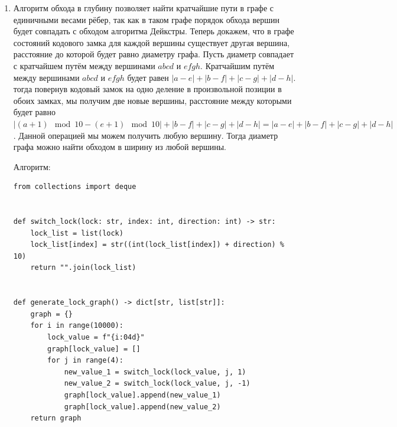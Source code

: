 \documentclass{article}
\begin{document}
\begin{enumerate}
	      Алгоритм:
	      \begin{lstlisting}
def has_neg_cycle(graph: dict[object, list[object]]) -> bool:
    colors = dict()
    stack = list(graph.keys())

    while stack:
        node = stack.pop()
        if node not in colors:
            colors[node] = 0

        for neighbor in graph.get(node, []):
            if neighbor not in colors:
                colors[neighbor] = 1 - colors[node]
                stack.append(neighbor)
            elif colors[neighbor] == colors[node]:
                return True

    return False
        \end{lstlisting}
	      Сложность алгоритма --- $O(|V| + |E|)$.

	\item Алгоритм обхода в глубину позволяет найти кратчайшие
	      пути в графе с единичными весами рёбер, так как в таком
	      графе порядок обхода вершин будет совпадать с обходом
	      алгоритма Дейкстры. Теперь докажем, что в графе состояний
	      кодового замка для каждой вершины существует другая вершина,
	      расстояние до которой будет равно диаметру графа. Пусть
	      диаметр совпадает с кратчайшем путём между вершинами
	      $abcd$ и $efgh$. Кратчайшим путём между вершинами $abcd$ и
	      $efgh$ будет равен $|a - e| + |b - f| + |c - g| + |d - h|$.
	      тогда повернув кодовый замок на одно деление в произвольной
	      позиции в обоих замках, мы получим две новые вершины, расстояние между
	      которыми будет равно
	      $|(a + 1) \mod 10 - (e + 1) \mod 10| +
		      |b - f| + |c - g| + |d - h| =
		      |a - e| + |b - f| + |c - g| + |d - h|$. Данной операцией
	      мы можем получить любую вершину. Тогда диаметр графа
	      можно найти обходом в ширину из любой вершины.

	      Алгоритм:
	      \begin{lstlisting}
from collections import deque


def switch_lock(lock: str, index: int, direction: int) -> str:
	lock_list = list(lock)
	lock_list[index] = str((int(lock_list[index]) + direction) % 10)
	return "".join(lock_list)


def generate_lock_graph() -> dict[str, list[str]]:
	graph = {}
	for i in range(10000):
		lock_value = f"{i:04d}"
		graph[lock_value] = []
		for j in range(4):
			new_value_1 = switch_lock(lock_value, j, 1)
			new_value_2 = switch_lock(lock_value, j, -1)
			graph[lock_value].append(new_value_1)
			graph[lock_value].append(new_value_2)
	return graph



\end{lstlisting}
\end{enumerate}
\end{document}
